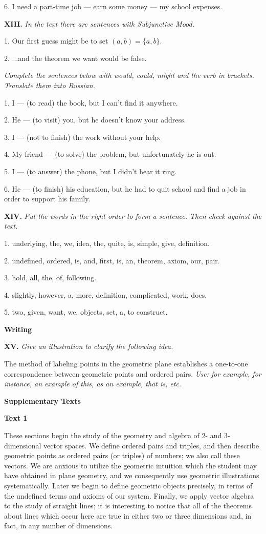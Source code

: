 \documentclass[a4paper]{article}
\newcommand{\ESect}[1]{\medskip\par{\large \textbf{#1}}\par}
\newcommand{\ETask}[2]{\medskip\par\textbf{#1.} \textit{#2}\par}
\begin{document}
6. I need a part-time job --- earn some money --- my school expenses.

\ETask{XIII}{In the text there are sentences with Subjunctive Mood.}

1. Our first guess might be to set $(a, b) = \{a, b\}$.

2. ...and the theorem we want would be false.

\textit{Complete the sentences below with would, could, might and the verb in brackets. Translate them into Russian.}

1. I --- (to read) the book, but I can't find it anywhere.

2. He --- (to visit) you, but he doesn't know your address.

3. I --- (not to finish) the work without your help.

4. My friend --- (to solve) the problem, but unfortunately he is out.

5. I --- (to answer) the phone, but I didn't hear it ring.

6. He --- (to finish) his education, but he had to quit school and find a job in order to support his family.

\ETask{XIV}{Put the words in the right order to form a sentence. Then check against the text.}

1. underlying, the, we, idea, the, quite, is, simple, give, definition.

2. undefined, ordered, is, and, first, is, an, theorem, axiom, our, pair.

3. hold, all, the, of, following.

4. slightly, however, a, more, definition, complicated, work, does.

5. two, given, want, we, objects, set, a, to construct.

\ESect{Writing}
\ETask{XV}{Give an illustration to clarify the following idea.}

The method of labeling points in the geometric plane establishes a one-to-one correspondence between geometric points and ordered pairs.
\textit{Use: for example, for instance, an example of this, as an example, that is, etc.}

\ESect{Supplementary Texts}
\ESect{Text 1}
These sections begin the study of the geometry and algebra of 2- and 3-dimensional vector spaces. We define ordered pairs
and triples, and then describe geometric points as ordered pairs (or triples) of numbers; we also call these vectors. We are
anxious to utilize the geometric intuition which the student may have obtained in plane geometry, and we consequently use
geometric illustrations systematically. Later we begin to define geometric objects precisely, in terms of the undefined terms
and axioms of our system. Finally, we apply vector algebra to the study of straight lines; it is interesting to notice that
all of the theorems about lines which occur here are true in either two or three dimensions and, in fact, in any number
of dimensions.
\end{document}
